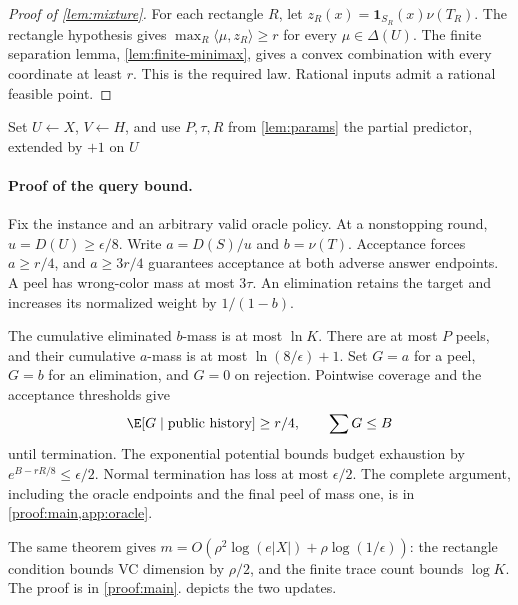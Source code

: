 \begin{proof}[Proof of \cref{lem:mixture}]
For each rectangle $R$, let $z_R(x)=\mathbf1_{S_R}(x)\nu(T_R)$. The rectangle hypothesis gives $\max_R\langle\mu,z_R\rangle\ge r$ for every $\mu\in\Delta(U)$. The finite separation lemma, \cref{lem:finite-minimax}, gives a convex combination with every coordinate at least $r$. This is the required law. Rational inputs admit a rational feasible point.
\end{proof}
\begin{algorithm}[t]
\caption{RECTIFY: rectangle peeling and elimination}\label{alg:rectify}
Set $U\gets X$, $V\gets H$, and use $P,\tau,R$ from \cref{lem:params}\;
\Return the partial predictor, extended by $+1$ on $U$\;
\end{algorithm}

\paragraph{Proof of the query bound.}
Fix the instance and an arbitrary valid oracle policy. At a nonstopping round, $u=D(U)\ge\epsilon/8$. Write $a=D(S)/u$ and $b=\nu(T)$. Acceptance forces $a\ge r/4$, and $a\ge3r/4$ guarantees acceptance at both adverse answer endpoints. A peel has wrong-color mass at most $3\tau$. An elimination retains the target and increases its normalized weight by $1/(1-b)$.

The cumulative eliminated $b$-mass is at most $\ln K$. There are at most $P$ peels, and their cumulative $a$-mass is at most $\ln(8/\epsilon)+1$. Set $G=a$ for a peel, $G=b$ for an elimination, and $G=0$ on rejection. Pointwise coverage and the acceptance thresholds give
\[
 \E[G\mid\text{public history}]\ge r/4,\qquad
 \sum G\le B
\]
until termination. The exponential potential bounds budget exhaustion by $e^{B-rR/8}\le\epsilon/2$. Normal termination has loss at most $\epsilon/2$. The complete argument, including the oracle endpoints and the final peel of mass one, is in \cref{proof:main,app:oracle}.

The same theorem gives $m=O(\rho^2\log(e|X|)+\rho\log(1/\epsilon))$: the rectangle condition bounds VC dimension by $\rho/2$, and the finite trace count bounds $\log K$. The proof is in \cref{proof:main}.  depicts the two updates.
